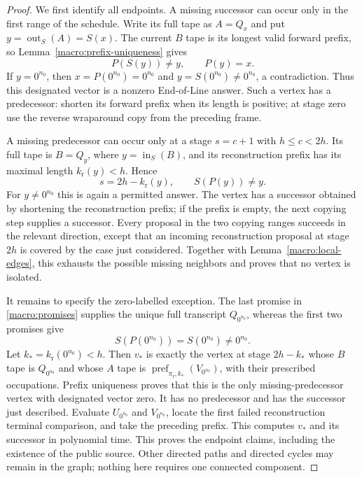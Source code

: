 \begin{proof}
We first identify all endpoints.  A missing successor can occur
only in the first range of the schedule.  Write its full tape as
$A=Q_x$ and put $y=\operatorname{out}_S(A)=S(x)$.  The current
$B$ tape is its longest valid forward prefix, so
Lemma~\ref{macro:prefix-uniqueness} gives
\begin{equation}\label{macro:sink-identity}
 P(S(y))\ne y,\qquad P(y)=x.
\end{equation}
If $y=0^{n_0}$, then $x=P(0^{n_0})=0^{n_0}$ and
$y=S(0^{n_0})\ne0^{n_0}$, a contradiction.  Thus this designated
vector is a nonzero End-of-Line answer.  Such a vertex has a
predecessor: shorten its forward prefix when its length is positive;
at stage zero use the reverse wraparound copy from the preceding
frame.

A missing predecessor can occur only at a stage $s=c+1$ with
$h\le c<2h$.  Its full tape is $B=Q_y$, where
$y=\operatorname{in}_S(B)$, and its reconstruction prefix has its
maximal length $k_{\mathrm r}(y)<h$.  Hence
\begin{equation}\label{macro:source-identity}
 s=2h-k_{\mathrm r}(y),\qquad S(P(y))\ne y.
\end{equation}
For $y\ne0^{n_0}$ this is again a permitted answer.  The vertex
has a successor obtained by shortening the reconstruction prefix;
if the prefix is empty, the next copying step supplies a successor.
Every proposal in the two copying ranges succeeds in the relevant
direction, except that an incoming reconstruction proposal at stage
$2h$ is covered by the case just considered.  Together with
Lemma~\ref{macro:local-edges}, this exhausts the possible missing
neighbors and proves that no vertex is isolated.

It remains to specify the zero-labelled exception.  The last promise
in \eqref{macro:promises} supplies the unique full transcript
$Q_{0^{n_0}}$, whereas the first two promises give
\[
 S(P(0^{n_0}))=S(0^{n_0})\ne0^{n_0}.
\]
Let $k_*=k_{\mathrm r}(0^{n_0})<h$.  Then $v_*$ is exactly the
vertex at stage $2h-k_*$ whose $B$ tape is $Q_{0^{n_0}}$ and whose
$A$ tape is
$\operatorname{pref}_{\pi_{\mathrm r},k_*}(V_{0^{n_0}})$,
with their prescribed occupations.  Prefix uniqueness proves that
this is the only missing-predecessor vertex with designated vector
zero.  It has no predecessor and has the successor just described.
Evaluate $U_{0^{n_0}}$ and $V_{0^{n_0}}$, locate the first failed
reconstruction terminal comparison, and take the preceding prefix.
This computes $v_*$ and its successor in polynomial time.  This
proves the endpoint claims, including the existence of the public
source.  Other directed paths and directed cycles may remain in the
graph; nothing here requires one connected component.


\end{proof}
